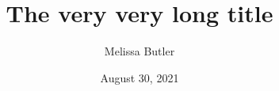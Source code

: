 \documentclass{beamer}
\title[Short title]{The very very long title}
\author[Melissa Butler]{Melissa Butler}
\institute[UWyo]{University of Wyoming}
\date{August 30, 2021}
\begin{document}
\begin{frame}
\maketitle
\end{frame}


\end{document}
